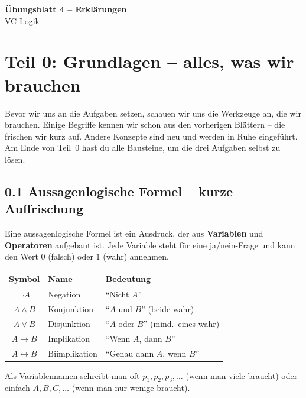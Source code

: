 \documentclass[a4paper,12pt]{article}
\begin{document}
\begin{center}
{\LARGE\bfseries \"Ubungsblatt 4 -- Erkl\"arungen}\\[0.5em]
{\large VC Logik}
\end{center}

\bigskip


\section*{Teil 0: Grundlagen -- alles, was wir brauchen}

Bevor wir uns an die Aufgaben setzen, schauen wir uns die Werkzeuge
an, die wir brauchen. Einige Begriffe kennen wir schon aus den
vorherigen Bl\"attern -- die frischen wir kurz auf. Andere Konzepte
sind neu und werden in Ruhe eingef\"uhrt. Am Ende von Teil~0 hast du
alle Bausteine, um die drei Aufgaben selbst zu l\"osen.

\subsection*{0.1 Aussagenlogische Formel -- kurze Auffrischung}

Eine aussagenlogische Formel ist ein Ausdruck, der aus \textbf{Variablen}
und \textbf{Operatoren} aufgebaut ist. Jede Variable steht f\"ur eine
ja/nein-Frage und kann den Wert $0$ (falsch) oder $1$ (wahr) annehmen.

\begin{center}
\renewcommand{\arraystretch}{1.4}
\begin{tabular}{c|l|l}
\toprule
\textbf{Symbol} & \textbf{Name} & \textbf{Bedeutung} \\
\midrule
$\neg A$ & Negation & "`Nicht $A$"' \\
$A \wedge B$ & Konjunktion & "`$A$ und $B$"' (beide wahr) \\
$A \vee B$ & Disjunktion & "`$A$ oder $B$"' (mind.\ eines wahr) \\
$A \to B$ & Implikation & "`Wenn $A$, dann $B$"' \\
$A \leftrightarrow B$ & Biimplikation & "`Genau dann $A$, wenn $B$"' \\
\bottomrule
\end{tabular}
\end{center}

Als Variablennamen schreibt man oft $p_1, p_2, p_3, \ldots$ (wenn man
viele braucht) oder einfach $A, B, C, \ldots$ (wenn man nur wenige
braucht).
\end{document}
